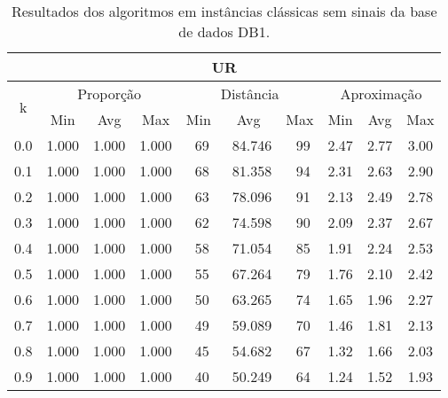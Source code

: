 \begin{table}[!tbh]
\caption{Resultados dos algoritmos em instâncias clássicas sem sinais da base de dados DB1.}
\label{table:AELVTSMQ}
\begin{center}
\scriptsize
{\def\arraystretch{1.05}\tabcolsep=8pt
\begin{tabular}{|c|c|c|c|c|c|c|c|c|c|}
\hline
\multicolumn{10}{|c|}{\bf UR}                                                                                             \\ \hline
\multirow{2}{*}{k} & \multicolumn{3}{c|}{Proporção}  & \multicolumn{3}{c|}{Distância} & \multicolumn{3}{c|}{Aproximação}  \\ \cline{2-10}
                   & Min       & Avg      & Max      & Min      & Avg      & Max     & Min     & Avg   & Max              \\ \hline
0.0                & 1.000     & 1.000    & 1.000    & ~69      & ~84.746  & ~99     & 2.47    & 2.77  & 3.00             \\ \hline
0.1                & 1.000     & 1.000    & 1.000    & ~68      & ~81.358  & ~94     & 2.31    & 2.63  & 2.90             \\ \hline
0.2                & 1.000     & 1.000    & 1.000    & ~63      & ~78.096  & ~91     & 2.13    & 2.49  & 2.78             \\ \hline
0.3                & 1.000     & 1.000    & 1.000    & ~62      & ~74.598  & ~90     & 2.09    & 2.37  & 2.67             \\ \hline
0.4                & 1.000     & 1.000    & 1.000    & ~58      & ~71.054  & ~85     & 1.91    & 2.24  & 2.53             \\ \hline
0.5                & 1.000     & 1.000    & 1.000    & ~55      & ~67.264  & ~79     & 1.76    & 2.10  & 2.42             \\ \hline
0.6                & 1.000     & 1.000    & 1.000    & ~50      & ~63.265  & ~74     & 1.65    & 1.96  & 2.27             \\ \hline
0.7                & 1.000     & 1.000    & 1.000    & ~49      & ~59.089  & ~70     & 1.46    & 1.81  & 2.13             \\ \hline
0.8                & 1.000     & 1.000    & 1.000    & ~45      & ~54.682  & ~67     & 1.32    & 1.66  & 2.03             \\ \hline
0.9                & 1.000     & 1.000    & 1.000    & ~40      & ~50.249  & ~64     & 1.24    & 1.52  & 1.93             \\ \hline

\end{tabular}}
\end{center}
\end{table}
